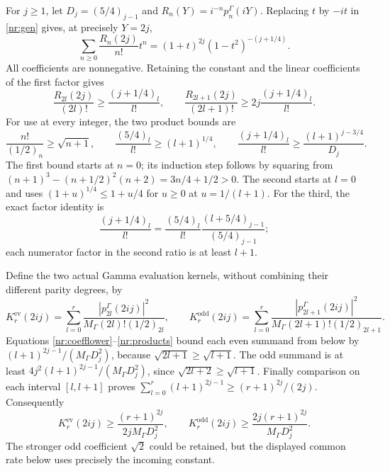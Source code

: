 \documentclass[11pt]{article}
\begin{document}
For $j\ge1$, let $D_j=(5/4)_{j-1}$ and
$R_n(Y)=i^{-n}p_n^\Gamma(iY)$. Replacing $t$ by $-it$ in
\eqref{nr:gen} gives, at precisely $Y=2j$,
\begin{equation}\tag{NR11}\label{nr:positivegen}
 \sum_{n\ge0}\frac{R_n(2j)}{n!}t^n
 =(1+t)^{2j}(1-t^2)^{-(j+1/4)}.
\end{equation}
All coefficients are nonnegative. Retaining the constant and the
linear coefficients of the first factor gives
\begin{equation}\tag{NR12}\label{nr:coefflower}
 \frac{R_{2l}(2j)}{(2l)!}\ge\frac{(j+1/4)_l}{l!},\qquad
 \frac{R_{2l+1}(2j)}{(2l+1)!}\ge
 2j\frac{(j+1/4)_l}{l!}.
\end{equation}
For use at every integer, the two product bounds are
\begin{equation}\tag{NR13}\label{nr:products}
 \frac{n!}{(1/2)_n}\ge\sqrt{n+1},\qquad
 \frac{(5/4)_l}{l!}\ge(l+1)^{1/4},\qquad
 \frac{(j+1/4)_l}{l!}\ge\frac{(l+1)^{j-3/4}}{D_j}.
\end{equation}
The first bound starts at $n=0$; its induction step follows by squaring
from
$(n+1)^3-(n+1/2)^2(n+2)=3n/4+1/2>0$.
The second starts at $l=0$ and uses
$(1+u)^{1/4}\le1+u/4$ for $u\ge0$ at $u=1/(l+1)$.
For the third, the exact factor identity is
\[
 \frac{(j+1/4)_l}{l!}
 =\frac{(5/4)_l}{l!}\frac{(l+5/4)_{j-1}}{(5/4)_{j-1}};
\]
each numerator factor in the second ratio is at least $l+1$.

Define the two actual Gamma evaluation kernels, without combining
their different parity degrees, by
\begin{equation}\tag{NR14}\label{nr:kernels}
 K_r^{\mathrm{ev}}(2ij)=\sum_{l=0}^r
 \frac{|p_{2l}^\Gamma(2ij)|^2}{M_\Gamma(2l)!(1/2)_{2l}},\qquad
 K_r^{\mathrm{odd}}(2ij)=\sum_{l=0}^r
 \frac{|p_{2l+1}^\Gamma(2ij)|^2}{M_\Gamma(2l+1)!(1/2)_{2l+1}}.
\end{equation}
Equations \eqref{nr:coefflower}--\eqref{nr:products} bound each even
summand from below by $(l+1)^{2j-1}/(M_\Gamma D_j^2)$, because
$\sqrt{2l+1}\ge\sqrt{l+1}$. The odd summand is at least
$4j^2(l+1)^{2j-1}/(M_\Gamma D_j^2)$, since
$\sqrt{2l+2}\ge\sqrt{l+1}$. Finally comparison on each interval
$[l,l+1]$ proves
$\sum_{l=0}^r(l+1)^{2j-1}\ge(r+1)^{2j}/(2j)$.
Consequently
\begin{equation}\tag{NR15}\label{nr:kernellower}
 K_r^{\mathrm{ev}}(2ij)\ge\frac{(r+1)^{2j}}{2jM_\Gamma D_j^2},
 \qquad
 K_r^{\mathrm{odd}}(2ij)\ge\frac{2j(r+1)^{2j}}{M_\Gamma D_j^2}.
\end{equation}
The stronger odd coefficient $\sqrt2$ could be retained, but the
displayed common rate below uses precisely the incoming constant.
\end{document}
